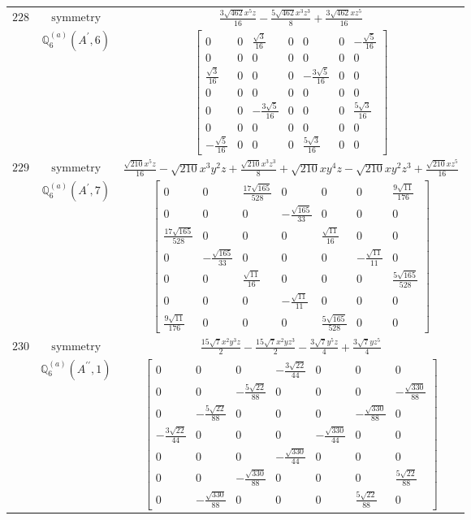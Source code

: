 \documentclass[fleqn,8pt,landscape]{jsarticle}
\begin{document}
\begin{longtable}{ccc}
$ 228 $ & $ \text{symmetry} $ & $ \frac{3 \sqrt{462} x^{5} z}{16} - \frac{5 \sqrt{462} x^{3} z^{3}}{8} + \frac{3 \sqrt{462} x z^{5}}{16} $ \\
$  $ & $ \mathbb{Q}_{6}^{(a)}(A^{\prime},6) $ & $ \begin{bmatrix} 0 & 0 & \frac{\sqrt{3}}{16} & 0 & 0 & 0 & - \frac{\sqrt{5}}{16} \\ 0 & 0 & 0 & 0 & 0 & 0 & 0 \\ \frac{\sqrt{3}}{16} & 0 & 0 & 0 & - \frac{3 \sqrt{5}}{16} & 0 & 0 \\ 0 & 0 & 0 & 0 & 0 & 0 & 0 \\ 0 & 0 & - \frac{3 \sqrt{5}}{16} & 0 & 0 & 0 & \frac{5 \sqrt{3}}{16} \\ 0 & 0 & 0 & 0 & 0 & 0 & 0 \\ - \frac{\sqrt{5}}{16} & 0 & 0 & 0 & \frac{5 \sqrt{3}}{16} & 0 & 0 \end{bmatrix} $ \\ \hline
$ 229 $ & $ \text{symmetry} $ & $ \frac{\sqrt{210} x^{5} z}{16} - \sqrt{210} x^{3} y^{2} z + \frac{\sqrt{210} x^{3} z^{3}}{8} + \sqrt{210} x y^{4} z - \sqrt{210} x y^{2} z^{3} + \frac{\sqrt{210} x z^{5}}{16} $ \\
$  $ & $ \mathbb{Q}_{6}^{(a)}(A^{\prime},7) $ & $ \begin{bmatrix} 0 & 0 & \frac{17 \sqrt{165}}{528} & 0 & 0 & 0 & \frac{9 \sqrt{11}}{176} \\ 0 & 0 & 0 & - \frac{\sqrt{165}}{33} & 0 & 0 & 0 \\ \frac{17 \sqrt{165}}{528} & 0 & 0 & 0 & \frac{\sqrt{11}}{16} & 0 & 0 \\ 0 & - \frac{\sqrt{165}}{33} & 0 & 0 & 0 & - \frac{\sqrt{11}}{11} & 0 \\ 0 & 0 & \frac{\sqrt{11}}{16} & 0 & 0 & 0 & \frac{5 \sqrt{165}}{528} \\ 0 & 0 & 0 & - \frac{\sqrt{11}}{11} & 0 & 0 & 0 \\ \frac{9 \sqrt{11}}{176} & 0 & 0 & 0 & \frac{5 \sqrt{165}}{528} & 0 & 0 \end{bmatrix} $ \\ \hline
$ 230 $ & $ \text{symmetry} $ & $ \frac{15 \sqrt{7} x^{2} y^{3} z}{2} - \frac{15 \sqrt{7} x^{2} y z^{3}}{2} - \frac{3 \sqrt{7} y^{5} z}{4} + \frac{3 \sqrt{7} y z^{5}}{4} $ \\
$  $ & $ \mathbb{Q}_{6}^{(a)}(A^{\prime\prime},1) $ & $ \begin{bmatrix} 0 & 0 & 0 & - \frac{3 \sqrt{22}}{44} & 0 & 0 & 0 \\ 0 & 0 & - \frac{5 \sqrt{22}}{88} & 0 & 0 & 0 & - \frac{\sqrt{330}}{88} \\ 0 & - \frac{5 \sqrt{22}}{88} & 0 & 0 & 0 & - \frac{\sqrt{330}}{88} & 0 \\ - \frac{3 \sqrt{22}}{44} & 0 & 0 & 0 & - \frac{\sqrt{330}}{44} & 0 & 0 \\ 0 & 0 & 0 & - \frac{\sqrt{330}}{44} & 0 & 0 & 0 \\ 0 & 0 & - \frac{\sqrt{330}}{88} & 0 & 0 & 0 & \frac{5 \sqrt{22}}{88} \\ 0 & - \frac{\sqrt{330}}{88} & 0 & 0 & 0 & \frac{5 \sqrt{22}}{88} & 0 \end{bmatrix} $ \\ \hline

\end{longtable}
\end{document}
